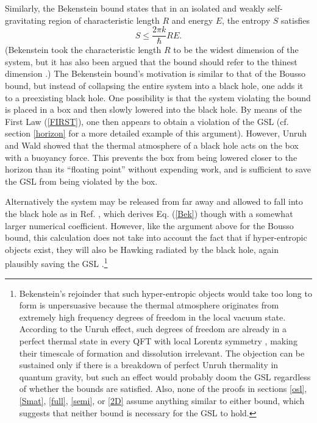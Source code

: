 \documentclass{article}
\begin{document}
Similarly, the Bekenstein bound states \cite{bek81} that in an isolated and weakly self-gravitating region of characteristic length $R$ and energy $E$, the entropy $S$ satisfies
\begin{equation}\label{Bek}
S \le \frac{2\pi k}{\hbar}RE.
\end{equation}
(Bekenstein took the characteristic length $R$ to be the widest dimension of the system, but it has also been argued that the bound should refer to the thinest dimension \cite{bousso02}.)  The Bekenstein bound's motivation is similar to that of the Bousso bound, but instead of collapsing the entire system into a black hole, one adds it to a preexisting black hole.  One possibility is that the system violating the bound is placed in a box and then slowly lowered into the black hole.  By means of the First Law (\ref{FIRST}), one then appears to obtain a violation of the GSL \cite{bek81} (cf. section \ref{horizon} for a more detailed example of this argument).  However, Unruh and Wald \cite{UW82} showed that the thermal atmosphere of a black hole acts on the box with a buoyancy force.  This prevents the box from being lowered closer to the horizon than its ``floating point'' without expending work, and is sufficient to save the GSL from being violated by the box.

Alternatively the system may be released from far away and allowed to fall into the black hole as in Ref. \cite{bek01}, which derives Eq. (\ref{Bek}) though with a somewhat larger numerical coefficient.  However, like the argument above for the Bousso bound, this calculation does not take into account the fact that if hyper-entropic objects exist, they will also be Hawking radiated by the black hole, again plausibly saving the GSL \cite{MS03}.\footnote{Bekenstein's rejoinder \cite{bek04} that such hyper-entropic objects would take too long to form is unpersuasive because the thermal atmosphere originates from extremely high frequency degrees of freedom in the local vacuum state.  According to the Unruh effect, such degrees of freedom are already in a perfect thermal state in every QFT with local Lorentz symmetry \cite{BWUW}, making their timescale of formation and dissolution irrelevant.  The objection can be sustained only if there is a breakdown of perfect Unruh thermality in quantum gravity, but such an effect would probably doom the GSL regardless of whether the bounds are satisfied.  Also, none of the proofs in sections \ref{osl}, \ref{Smat}, \ref{full}, \ref{semi}, or \ref{2D} assume anything similar to either bound, which suggests that neither bound is necessary for the GSL to hold.}
\end{document}
